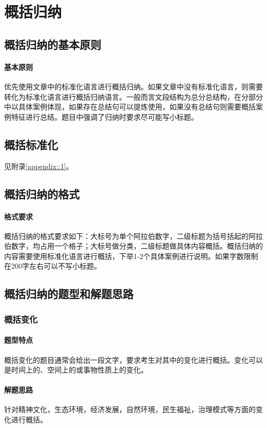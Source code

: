 \section{概括归纳}

\subsection{概括归纳的基本原则}

\paragraph{基本原则} 优先使用文章中的标准化语言进行概括归纳。如果文章中没有标准化语言，则需要转化为标准化语言进行概括归纳语言。一般而言文段结构为总分总结构，在分部分中以具体案例体现，如果存在总结句可以提炼使用，如果没有总结句则需要概括案例特征进行总结。题目中强调了归纳时要求尽可能写小标题。

\subsection{概括标准化} 见附录\ref{appendix::1}。

\subsection{概括归纳的格式}

\paragraph{格式要求} 概括归纳的格式要求如下：大标号为单个阿拉伯数字，二级标题为括号括起的阿拉伯数字，均占用一个格子；大标号做分类，二级标题做具体内容概括。概括归纳的内容需要使用标准化语言进行概括，下举1-2个具体案例进行说明。如果字数限制在200字左右可以不写小标题。

\subsection{概括归纳的题型和解题思路}

\subsubsection{概括变化}

\paragraph{题型特点} 概括变化的题目通常会给出一段文字，要求考生对其中的变化进行概括。变化可以是时间上的、空间上的或事物性质上的变化。

\paragraph{解题思路} 针对精神文化，生态环境，经济发展，自然环境，民生福祉，治理模式等方面的变化进行概括。

